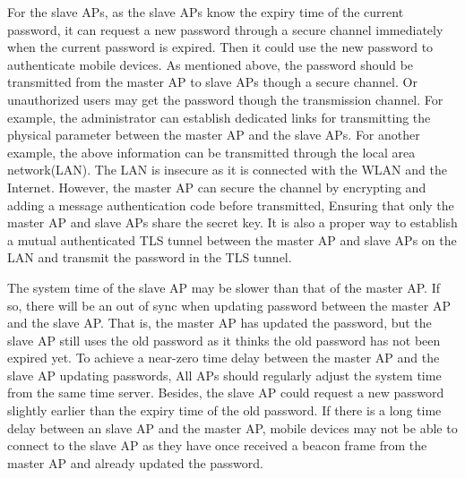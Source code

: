 For the slave APs, as the slave APs know the expiry time of the current password, it can request a new password through a secure channel immediately when the current password is expired. Then it could use the new password to authenticate mobile devices. As mentioned above, the password should be transmitted from the master AP to slave APs though a secure channel. Or unauthorized users may get the password though the transmission channel. For example, the administrator can establish dedicated links for transmitting the physical parameter between the master AP and the slave APs. For another example, the above information can be transmitted through the local area network(LAN). The LAN is insecure as it is connected with the WLAN and the Internet. However, the master AP can secure the channel by encrypting and adding a message authentication code before transmitted, Ensuring that only the master AP and slave APs share the secret key. It is also a proper way to establish a mutual authenticated TLS tunnel between the master AP and slave APs on the LAN and transmit the password in the TLS tunnel. 

The system time of the slave AP may be slower than that of the master AP. If so, there will be an out of sync when updating password between the master AP and the slave AP. That is, the master AP has updated the password, but the slave AP still uses the old password as it thinks the old password has not been expired yet. To achieve a near-zero time delay between the master AP and the slave AP updating passwords, All APs should regularly adjust the system time from the same time server. Besides, the slave AP could request a new password slightly earlier than the expiry time of the old password. If there is a long time delay between an slave AP and the master AP, mobile devices may not be able to connect to the slave AP as they have once received a beacon frame from the master AP and already updated the password. 

